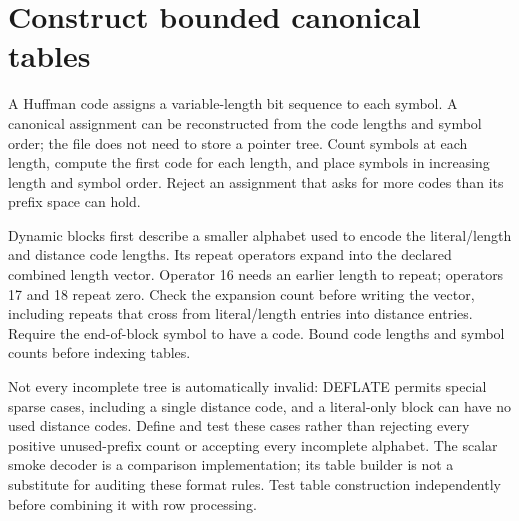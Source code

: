 \section{Construct bounded canonical tables}
A Huffman code assigns a variable-length bit sequence to each symbol. A canonical
assignment can be reconstructed from the code lengths and symbol order; the file
does not need to store a pointer tree. Count symbols at each length, compute the
first code for each length, and place symbols in increasing length and symbol order.
Reject an assignment that asks for more codes than its prefix space can hold.

Dynamic blocks first describe a smaller alphabet used to encode the literal/length
and distance code lengths. Its repeat operators expand into the declared combined
length vector. Operator 16 needs an earlier length to repeat; operators 17 and 18
repeat zero. Check the expansion count before writing the vector, including repeats
that cross from literal/length entries into distance entries. Require the end-of-block
symbol to have a code. Bound code lengths and symbol counts before indexing tables.

Not every incomplete tree is automatically invalid: DEFLATE permits special sparse
cases, including a single distance code, and a literal-only block can have no used
distance codes. Define and test these cases rather than rejecting every positive
unused-prefix count or accepting every incomplete alphabet. The scalar smoke decoder
is a comparison implementation; its table builder is not a substitute for auditing
these format rules. Test table construction independently before combining it with
row processing.
